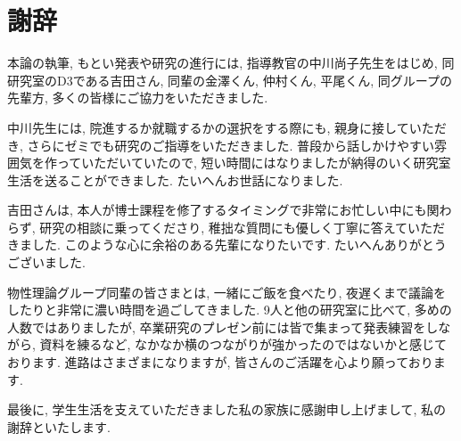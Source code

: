\chapter*{謝辞}

本論の執筆, もとい発表や研究の進行には, 指導教官の中川尚子先生をはじめ, 同研究室のD3である吉田さん, 同輩の金澤くん, 仲村くん, 平尾くん, 同グループの先輩方, 多くの皆様にご協力をいただきました. 

中川先生には, 院進するか就職するかの選択をする際にも, 親身に接していただき, さらにゼミでも研究のご指導をいただきました. 普段から話しかけやすい雰囲気を作っていただいていたので, 短い時間にはなりましたが納得のいく研究室生活を送ることができました. たいへんお世話になりました. 

吉田さんは, 本人が博士課程を修了するタイミングで非常にお忙しい中にも関わらず, 研究の相談に乗ってくださり, 稚拙な質問にも優しく丁寧に答えていただきました. このような心に余裕のある先輩になりたいです. たいへんありがとうございました. 

物性理論グループ同輩の皆さまとは, 一緒にご飯を食べたり, 夜遅くまで議論をしたりと非常に濃い時間を過ごしてきました. 9人と他の研究室に比べて, 多めの人数ではありましたが, 卒業研究のプレゼン前には皆で集まって発表練習をしながら, 資料を練るなど, なかなか横のつながりが強かったのではないかと感じております. 進路はさまざまになりますが, 皆さんのご活躍を心より願っております.

最後に, 学生生活を支えていただきました私の家族に感謝申し上げまして, 私の謝辞といたします.

